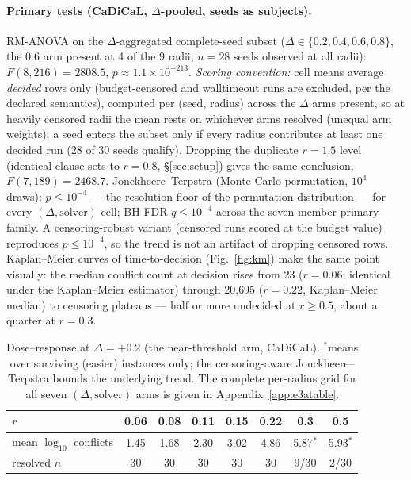 \documentclass[manuscript, screen, review]{jair}
\begin{document}
\paragraph{Primary tests (CaDiCaL, $\Delta$-pooled, seeds as subjects).}
RM-ANOVA on the $\Delta$-aggregated complete-seed subset ($\Delta\in\{0.2,
0.4,0.6,0.8\}$, the $0.6$ arm present at 4 of the 9 radii; $n=28$ seeds
observed at all radii): $F(8,216)=2808.5$, $p\approx1.1\times10^{-213}$.
\emph{Scoring convention:} cell means average \emph{decided} rows only
(budget-censored and walltimeout runs are excluded, per the declared
semantics), computed per (seed, radius) across the $\Delta$ arms present, so
at heavily censored radii the mean rests on whichever arms resolved
(unequal arm weights); a seed enters the subset only if every radius
contributes at least one decided run ($28$ of $30$ seeds qualify).
Dropping the duplicate $r{=}1.5$ level (identical clause sets to $r{=}0.8$,
\S\ref{sec:setup}) gives the same conclusion,
$F(7,189)=2468.7$. Jonckheere--Terpstra (Monte Carlo permutation, $10^4$
draws): $p\le10^{-4}$
--- the resolution floor of the permutation distribution --- for every
$(\Delta, \text{solver})$ cell; BH-FDR $q \le 10^{-4}$ across the seven-member
primary family. A censoring-robust variant (censored runs scored at the
budget value) reproduces $p\le10^{-4}$, so the trend is not an artifact of
dropping censored rows. Kaplan--Meier curves of time-to-decision
(Fig.~\ref{fig:km}) make the same point visually: the median conflict count at
decision rises from 23 ($r=0.06$; identical under the Kaplan--Meier
estimator) through 20{,}695 ($r=0.22$, Kaplan--Meier median) to censoring
plateaus --- half or more undecided at $r\ge0.5$, about a quarter at $r=0.3$.

\begin{table}[h]
\centering
\caption{Dose--response at $\Delta=+0.2$ (the near-threshold arm, CaDiCaL).
$^{*}$means over surviving (easier) instances only; the censoring-aware
Jonckheere--Terpstra bounds the underlying trend. The complete per-radius
grid for all seven $(\Delta, \text{solver})$ arms is given in
Appendix~\ref{app:e3atable}.}
\begin{tabular}{lccccccc}
\toprule
$r$ & 0.06 & 0.08 & 0.11 & 0.15 & 0.22 & 0.3 & 0.5\\
\midrule
mean $\log_{10}$ conflicts & 1.45 & 1.68 & 2.30 & 3.02 & 4.86 & 5.87$^{*}$ & 5.93$^{*}$\\
resolved $n$ & 30 & 30 & 30 & 30 & 30 & 9/30 & 2/30\\
\bottomrule
\end{tabular}

\label{tab:dose}
\end{table}
\end{document}

